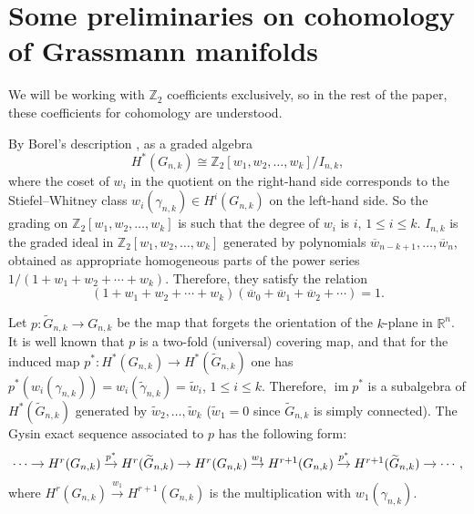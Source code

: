 \documentclass{amsart}
\newcommand{\im}{\operatorname{im}}
\theoremstyle{definition}
\theoremstyle{remark}
\numberwithin{equation}{section}
\begin{document}
\section{Some preliminaries on cohomology of Grassmann manifolds}
\label{preliminaries}

We will be working with $\mathbb Z_2$ coefficients exclusively, so in the rest of the paper, these coefficients for cohomology are understood.

By Borel's description \cite{Borel}, as a graded algebra
\begin{equation}\label{kohomologija_grasmanijana}
H^*(G_{n,k})\cong\mathbb Z_2[w_1,w_2,\ldots,w_k]/I_{n,k},
\end{equation}
where the coset of $w_i$ in the quotient on the right-hand side corresponds to the Stiefel--Whitney class $w_i(\gamma_{n,k})\in H^i(G_{n,k})$ on the left-hand side. So the grading on $\mathbb Z_2[w_1,w_2,\ldots,w_k]$ is such that the degree of $w_i$ is $i$, $1\le i\le k$. $I_{n,k}$ is the graded ideal in $\mathbb Z_2[w_1,w_2,\ldots,w_k]$ generated by polynomials $\overline w_{n-k+1},\ldots,\overline w_n$, obtained as appropriate homogeneous parts of the power series $1/(1+w_1+w_2+\cdots+w_k)$. Therefore, they satisfy the relation
\begin{equation}\label{power_series}
(1+w_1+w_2+\cdots+w_k)(\overline w_0+\overline w_1+\overline w_2+\cdots)=1.    
\end{equation}

Let $p:\widetilde G_{n,k}\rightarrow G_{n,k}$ be the map that forgets the orientation of the $k$-plane in $\mathbb R^n$. It is well known that $p$ is a two-fold (universal) covering map, and that for the induced map $p^*:H^*(G_{n,k})\rightarrow H^*(\widetilde G_{n,k})$ one has $p^*(w_i(\gamma_{n,k}))=w_i(\widetilde\gamma_{n,k})=\widetilde w_i$, $1\le i\le k$. Therefore, $\im p^*$ is a subalgebra of $H^*(\widetilde G_{n,k})$ generated by $\widetilde w_2,\ldots,\widetilde w_k$ ($\widetilde w_1=0$ since $\widetilde G_{n,k}$ is simply connected). The Gysin exact sequence associated to $p$ has the following form:
\[\begin{tikzcd}[column sep = 1em, font = \small, cramped]
\cdots
\arrow{r}
&
H^r(G_{n,k})
\arrow{r}{p^*}
&
H^r(\widetilde G_{n,k})
\arrow{r}
&
H^r(G_{n,k})
\arrow{r}{w_1}
&
H^{r+1}(G_{n,k})
\arrow{r}{p^*}
&
H^{r+1}(\widetilde G_{n,k})
\arrow{r}
&
\cdots,
\end{tikzcd}\]
where $H^r(G_{n,k})\stackrel{w_1}\longrightarrow H^{r+1}(G_{n,k})$ is the multiplication with $w_1(\gamma_{n,k})$.
\end{document}
